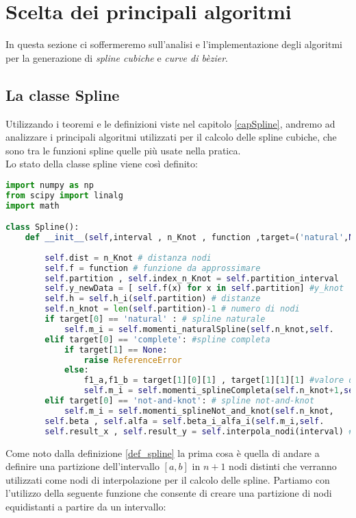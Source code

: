 \documentclass[a4paper,12pt]{report}
\theoremstyle{definition}
\begin{document}
\section{Scelta dei principali algoritmi}
In questa sezione ci soffermeremo sull'analisi e l'implementazione degli algoritmi per la generazione di \textit{spline cubiche} e \textit{curve di bèzier}.
\subsection{La classe Spline}
Utilizzando i teoremi e le definizioni viste nel capitolo \ref{capSpline}, andremo ad analizzare i principali algoritmi utilizzati per il calcolo delle spline cubiche, che sono tra le funzioni spline quelle più usate nella pratica.\\
Lo stato della classe spline viene così definito:
\begin{lstlisting}[language=Python]
import numpy as np
from scipy import linalg
import math

class Spline():
	def __init__(self,interval , n_Knot , function ,target=('natural',None)):
	
		self.dist = n_Knot # distanza nodi
		self.f = function # funzione da approssimare
		self.partition , self.index_n_Knot = self.partition_interval		(interval,self.dist)
		self.y_newData = [ self.f(x) for x in self.partition] #y_knot
		self.h = self.h_i(self.partition) # distanze
		self.n_knot = len(self.partition)-1 # numero di nodi
		if target[0] == 'natural' : # spline naturale
			self.m_i = self.momenti_naturalSpline(self.n_knot,self.				y_newData,self.h)
		elif target[0] == 'complete': #spline completa
			if target[1] == None:
				raise ReferenceError
			else:
				f1_a,f1_b = target[1][0][1] , target[1][1][1] #valore derivata agli estremi
				self.m_i = self.momenti_splineCompleta(self.n_knot+1,self.			y_newData,self.h,f1_a,f1_b)
		elif target[0] == 'not-and-knot': # spline not-and-knot
			self.m_i = self.momenti_splineNot_and_knot(self.n_knot,				self.y_newData,self.h)
		self.beta , self.alfa = self.beta_i_alfa_i(self.m_i,self.			y_newData,self.n_knot,self.h)
		self.result_x , self.result_y = self.interpola_nodi(interval) #calcolo s(x) perogni x in [a,b]\end{lstlisting}
Come noto dalla definizione \ref{def_spline} la prima cosa è quella di andare a definire una partizione dell'intervallo $[a,b]$ in $n+1$ nodi distinti che verranno utilizzati come nodi di interpolazione per il calcolo delle spline. Partiamo con l'utilizzo della seguente funzione che consente di creare una partizione di nodi equidistanti a partire da un intervallo:\\
\end{document}

